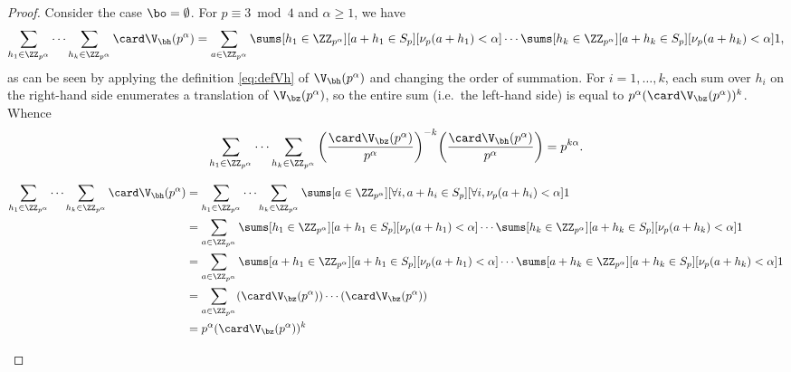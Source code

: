\documentclass[12pt, reqno, twoside, letterpaper]{amsart}
\begin{document}
\begin{proof}
Consider the case $\bo = \emptyset$.
%
For $p \equiv 3 \bmod 4$ and $\alpha \ge 1$, we have 
\[
 \sum_{h_1 \in \ZZ_{p^{\alpha}}}
  \cdots 
   \sum_{h_k \in \ZZ_{p^{\alpha}}}
    \card \V_{\bh}(p^{\alpha})
   =
   \sum_{a \in \ZZ_{p^{\alpha}}}
    \sums[h_1 \in \ZZ_{p^{\alpha}}][a + h_1 \in S_p][\nu_p(a + h_1) < \alpha]
     \cdots 
      \sums[h_k \in \ZZ_{p^{\alpha}}][a + h_k \in S_p][\nu_p(a + h_k) < \alpha] 1,
\]
as can be seen by applying the definition \eqref{eq:defVh} of 
$\V_{\bh}(p^{\alpha})$ and changing the order of summation.
%
For $i = 1,\ldots,k$, each sum over $h_i$ on the right-hand side 
enumerates a translation of $\V_{\bz}(p^{\alpha})$, so the 
entire sum (i.e.\ the left-hand side) is equal to 
$p^{\alpha}(\card \V_{\bz}(p^{\alpha}))^k$.
%
Whence 
\[
 \sum_{h_1 \in \ZZ_{p^{\alpha}}}
  \cdots 
   \sum_{h_k \in \ZZ_{p^{\alpha}}}
    \bigg(\frac{\card \V_{\bz}(p^{\alpha})}{p^{\alpha}}\bigg)^{-k}
     \bigg(\frac{\card \V_{\bh}(p^{\alpha})}{p^{\alpha}}\bigg)
      =
       p^{k\alpha}.
\]
%
%
\begin{nixnix}
%
\begin{align*}
  \sum_{h_1 \in \ZZ_{p^{\alpha}}}
   \cdots 
    \sum_{h_k \in \ZZ_{p^{\alpha}}}
     \card \V_{\bh}(p^{\alpha})
  & = 
      \sum_{h_1 \in \ZZ_{p^{\alpha}}}
       \cdots 
        \sum_{h_k \in \ZZ_{p^{\alpha}}}
         \sums[a \in \ZZ_{p^{\alpha}}][\forall i, a + h_i \in S_p][\forall i, \nu_p(a + h_i) < \alpha] 1
 \\ 
  & = 
   \sum_{a \in \ZZ_{p^{\alpha}}}
    \sums[h_1 \in \ZZ_{p^{\alpha}}][a + h_1 \in S_p][\nu_p(a + h_1) < \alpha]
     \cdots 
      \sums[h_k \in \ZZ_{p^{\alpha}}][a + h_k \in S_p][\nu_p(a + h_k) < \alpha] 1
 \\
 & = 
   \sum_{a \in \ZZ_{p^{\alpha}}}
    \sums[a + h_1 \in \ZZ_{p^{\alpha}}][a + h_1 \in S_p][\nu_p(a + h_1) < \alpha]
     \cdots 
      \sums[a + h_k \in \ZZ_{p^{\alpha}}][a + h_k \in S_p][\nu_p(a + h_k) < \alpha] 1   
 \\
 & = 
    \sum_{a \in \ZZ_{p^{\alpha}}}
     (\card \V_{\bz}(p^{\alpha}))
      \cdots 
       (\card \V_{\bz}(p^{\alpha}))
 \\
 & = 
    p^{\alpha}(\card \V_{\bz}(p^{\alpha}))^k
\end{align*}
%
\end{nixnix}
%

\end{proof}
\end{document}
